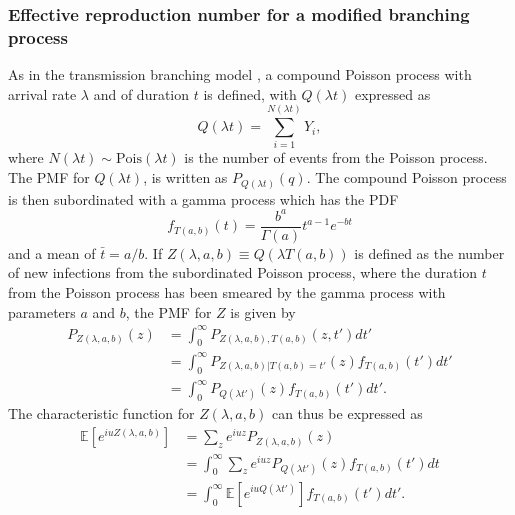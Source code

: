 \documentclass[sr]{drdc-report}
\def\tbar{\ensuremath{{}\bar{t}}}
\newcommand{\Pois}{\ensuremath{\mathrm{Pois}}}
\newcommand{\ex}[1]{\mathbb{E}\left[#1\right]}
\begin{document}
\subsubsection{Effective reproduction number for a modified branching process}
As in the transmission branching model \cite{branchsim}, a compound Poisson process with arrival rate $\lambda$ and of duration $t$ is defined, with $Q(\lambda t)$ expressed as
\begin{equation}
Q(\lambda t)=\sum_{i=1}^{N(\lambda t)}Y_i,
\end{equation}
where $N(\lambda t)\sim\Pois(\lambda t)$ is the number of events from the Poisson process.
The PMF for $Q(\lambda t)$, is written as $P_{Q(\lambda t)}(q)$.
The compound Poisson process is then subordinated with a gamma process which has the PDF
\begin{equation}
f_{T(a,b)}(t)=\frac{b^a}{\Gamma(a)}t^{a-1}e^{-bt}\label{gammaPDF}
\end{equation}
and a mean of $\tbar=a/b$.
If $Z(\lambda,a,b)\equiv Q(\lambda T(a,b))$ is defined as the number of new infections from the subordinated Poisson process, where the duration $t$ from the Poisson process has been smeared by the gamma process with parameters $a$ and $b$, the PMF for $Z$ is given by
\begin{align}
P_{Z(\lambda,a,b)}(z) & = \int_0^\infty P_{Z(\lambda,a,b),T(a,b)}(z,t')dt'\nonumber\\
& = \int_0^\infty P_{Z(\lambda,a,b)|T(a,b)=t'}(z)f_{T(a,b)}(t')dt'\nonumber\\
& = \int_0^\infty P_{Q(\lambda t')}(z)f_{T(a,b)}(t')dt'.
\end{align}
The characteristic function for $Z(\lambda,a,b)$ can thus be expressed as
\begin{align}
\ex{e^{iuZ(\lambda,a,b)}} & = \sum_z e^{iuz}P_{Z(\lambda,a,b)}(z)\nonumber\\
& = \int_0^\infty \sum_z e^{iuz}P_{Q(\lambda t')}(z)f_{T(a,b)}(t')dt\nonumber\\
& = \int_0^\infty \ex{e^{iuQ(\lambda t')}}f_{T(a,b)}(t')dt'.\label{ZCF}
\end{align}
\end{document}
